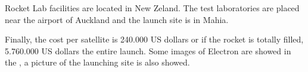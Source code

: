 Rocket Lab facilities are located in New Zeland. The test laboratories are placed near the airport of Auckland and the launch site is in Mahia.

Finally, the cost per satellite is 240.000 US dollars or if the rocket is totally filled, 5.760.000 US dollars the entire launch. Some images of Electron are showed in the  \cite[Chapter 1, Section 1]{annex2}, a picture of the launching site is also showed. 